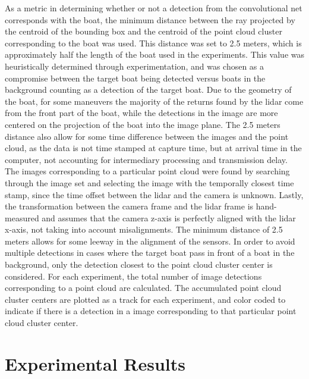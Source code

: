 As a metric in determining whether or not a detection from the convolutional net corresponds with the boat, the minimum distance between the ray projected by the centroid of the bounding box and the centroid of the point cloud cluster corresponding to the boat was used. This distance was set to 2.5 meters, which is approximately half the length of the boat used in the experiments. This value was heuristically determined through experimentation, and was chosen as a compromise between the target boat being detected versus boats in the background counting as a detection of the target boat. Due to the geometry of the boat, for some maneuvers the majority of the returns found by the lidar come from the front part of the boat, while the detections in the image are more centered on the projection of the boat into the image plane. The 2.5 meters distance also allow for some time difference between the images and the point cloud, as the data is not time stamped at capture time, but at arrival time in the computer, not accounting for intermediary processing and transmission delay. The images corresponding to a particular point cloud were found by searching through the image set and selecting the image with the temporally closest time stamp, since the time offset between the lidar and the camera is unknown. Lastly, the transformation between the camera frame and the lidar frame is hand-measured and assumes that the camera z-axis is perfectly aligned with the lidar x-axis, not taking into account misalignments. The minimum distance of 2.5 meters allows for some leeway in the alignment of the sensors. In order to avoid multiple detections in cases where the target boat pass in front of a boat in the background, only the detection closest to the point cloud cluster center is considered. For each experiment, the total number of image detections corresponding to a point cloud are calculated. The accumulated point cloud cluster centers are plotted as a track for each experiment, and color coded to indicate if there is a detection in a image corresponding to that particular point cloud cluster center.
\section{Experimental Results}
